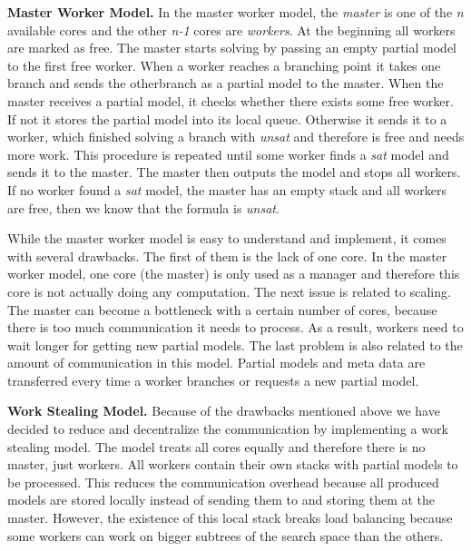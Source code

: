 \documentclass[letterpaper]{article}
\newcommand{\mypar}[1]{{\bf #1.}}
\begin{document}
\mypar{Master Worker Model}
In the master worker model, the \textit{master} is one of the \textit{n} available cores and the other \textit{n-1} cores are \textit{workers}.
At the beginning all workers are marked as free.
The master starts solving by passing an empty partial model to the first free worker.
When a worker reaches a branching point it takes one branch and sends the other\linebreak branch as a partial model to the master.
When the master receives a partial model, it checks whether there exists some free worker.
If not it stores the partial model into its local queue.
Otherwise it sends it to a worker, which finished solving a branch with \textit{unsat} and therefore is free and needs more work.
This procedure is repeated until some worker finds a \textit{sat} model and sends it to the master.
The master then outputs the model and stops all workers.
If no worker found a \textit{sat} model, the master has an empty stack and all workers are free, then we know that the formula is \textit{unsat}.

While the master worker model is easy to understand and implement, it comes with several drawbacks.
The first of them is the lack of one core.
In the master worker model, one core (the master) is only used as a manager and therefore this core is not actually doing any computation.
The next issue is related to scaling.
The master can become a bottleneck with a certain number of cores, because there is too much communication it needs to process.
As a result, workers need to wait longer for getting new partial models.
The last problem is also related to the amount of communication in this model.
Partial models and meta data are transferred every time a worker branches or requests a new partial model.

\mypar{Work Stealing Model}
Because of the drawbacks mentioned above we have decided to reduce and decentralize the communication by implementing a work stealing model.
The model treats all cores equally and therefore there is no master, just workers.
All workers contain their own stacks with partial models to be processed.
This reduces the communication overhead because all produced models are stored locally instead of sending them to and storing them at the master.
However, the existence of this local stack breaks load balancing because some workers can work on bigger subtrees of the search space than the others.
\end{document}
